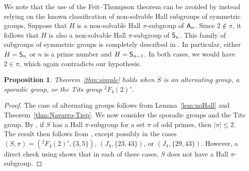 \documentclass[12pt]{amsart}
\newtheorem{proposition}[theorem]{Proposition}
\theoremstyle{definition}
\numberwithin{equation}{section}
\newcommand{\Irr}{{\mathrm {Irr}}}
\newcommand{\QQ}{{\mathbb Q}}
\newcommand{\ZZ}{{\mathbb Z}}
\newcommand{\Al}{\textup{\textsf{A}}}
\newcommand{\Sy}{\textup{\textsf{S}}}
\begin{document}
We note that the use of the Feit--Thompson theorem can be avoided by
instead relying on the known classification %
of non-solvable Hall
subgroups of %
symmetric groups. Suppose that $H$ is %
a non-solvable
Hall $\pi$-subgroup %
of $\Al_n$. Since $2 \notin \pi$, it follows
that $H$ is also %
a non-solvable Hall %
$\pi$-subgroup of $\Sy_n$. This
family of subgroups of symmetric groups is completely described in
\cite{Thompson}. In particular, either $H = \Sy_n$ or $n$ is a prime
number and $H = \Sy_{n-1}$. In both cases, we would have $2 \in
\pi$, which again contradicts our hypothesis.



\begin{proposition}\label{prop:alternatingandsporadic}
Theorem~\ref{thm:simple} holds %
when $S$ is an alternating group, a
sporadic group, or the Tits group ${}^2F_4(2)'$.
\end{proposition}

\begin{proof}
The case of alternating groups follows from Lemma~\ref{lem:noHall}
and Theorem~\ref{thm:Navarro-Tiep}. We now consider the sporadic
groups and the Tits group. By \cite[Theorem~6.14]{G86}, if $S$ has a
Hall $\pi$-subgroup for a set $\pi$ of odd primes, then $|\pi| \le
2$. The result then follows from \cite[Theorem~2.1]{GHSV21}, except
possibly in the cases $(S,\pi)=({}^2F_4(2)',\{3,5\})$, $(J_4,
\{23,43\})$, or $(J_4,\{29,43\})$. However, a direct check using
\cite{Atl1} shows that in each of these cases, $S$ does not have a
Hall $\pi$-subgroup.
\end{proof}
\end{document}
